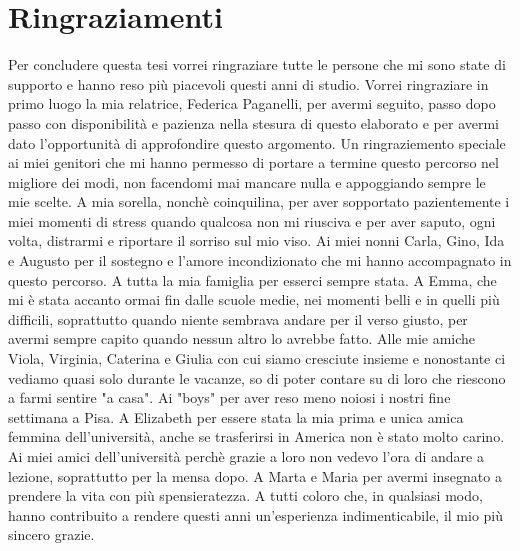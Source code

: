 \chapter{Ringraziamenti}
Per concludere questa tesi vorrei ringraziare tutte le persone che mi sono state di supporto e 
hanno reso più piacevoli questi anni di studio.
\newline Vorrei ringraziare in primo luogo la mia relatrice, Federica Paganelli, per avermi seguito, passo dopo passo con disponibilità e pazienza nella stesura di questo elaborato e
per avermi dato l'opportunità di approfondire questo argomento.
\newline Un ringraziemento speciale ai miei genitori che mi hanno permesso di portare a termine questo percorso nel migliore 
dei modi, non facendomi mai mancare nulla e appoggiando sempre le mie scelte.
\newline A mia sorella, nonchè coinquilina, per aver sopportato pazientemente i miei momenti di stress quando qualcosa non  
mi riusciva e per aver saputo, ogni volta, distrarmi e riportare il sorriso sul mio viso.
\newline Ai miei nonni Carla, Gino, Ida e Augusto per il sostegno e l'amore incondizionato che mi hanno accompagnato in questo percorso.
\newline A tutta la mia famiglia per esserci sempre stata.
\newline A Emma, che mi è stata accanto ormai fin dalle scuole medie,  nei momenti belli e in quelli più difficili, soprattutto quando niente 
sembrava andare per il verso giusto, per avermi sempre capito quando nessun altro lo avrebbe fatto.
\newline Alle mie amiche Viola, Virginia, Caterina e Giulia con cui siamo cresciute insieme e nonostante ci vediamo quasi solo 
durante le vacanze, so di poter contare su di loro che riescono a farmi sentire "a casa".
\newline Ai "boys" per aver reso meno noiosi i nostri fine settimana a Pisa.
\newline A Elizabeth per essere stata la mia prima e unica amica femmina dell'università, 
anche se trasferirsi in America non è stato molto carino.
\newline Ai miei amici dell'università perchè grazie a loro non vedevo l'ora di andare a lezione, soprattutto per la mensa dopo.
\newline A Marta e Maria per avermi insegnato a prendere la vita con più spensieratezza.
\newline A tutti coloro che, in qualsiasi modo, hanno contribuito a rendere questi anni un'esperienza indimenticabile, 
il mio più sincero grazie.

